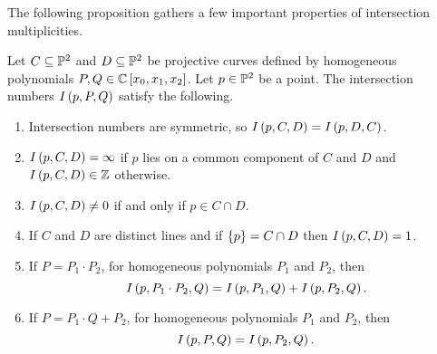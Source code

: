The following proposition gathers a few important properties of intersection multiplicities.

\begin{proposition}
\label{prop:12.5}
Let $ C \subseteq \P^2 $ and $ D \subseteq \P^2 $ be projective curves defined by homogeneous polynomials $ P, Q \in \C\sb{x_0, x_1, x_2} $. Let $ p \in \P^2 $ be a point. The intersection numbers $ I\rb{p, P, Q} $ satisfy the following.
\begin{enumerate}
\item Intersection numbers are symmetric, so $ I\rb{p, C, D} = I\rb{p, D, C} $.
\item $ I\rb{p, C, D} = \infty $ if $ p $ lies on a common component of $ C $ and $ D $ and $ I\rb{p, C, D} \in \Z $ otherwise.
\item $ I\rb{p, C, D} \ne 0 $ if and only if $ p \in C \cap D $.
\item If $ C $ and $ D $ are distinct lines and if $ \cb{p} = C \cap D $ then $ I\rb{p, C, D} = 1 $.
\item If $ P = P_1 \cdot P_2 $, for homogeneous polynomials $ P_1 $ and $ P_2 $, then
$$ I\rb{p, P_1 \cdot P_2, Q} = I\rb{p, P_1, Q} + I\rb{p, P_2, Q}. $$
\item If $ P = P_1 \cdot Q + P_2 $, for homogeneous polynomials $ P_1 $ and $ P_2 $, then
$$ I\rb{p, P, Q} = I\rb{p, P_2, Q}. $$
\end{enumerate}
\end{proposition}

\pagebreak

